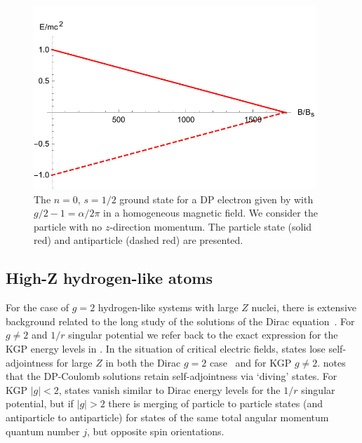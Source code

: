 \begin{figure}[ht]
     \centering
     \includegraphics[clip, trim=0.0cm 0.0cm 0.0cm 0.5cm,width=0.95\textwidth]{plots/chap02moment/lanplot02.pdf}
     \caption{The $n=0$, $s=1/2$ ground state for a DP electron given by  with $g/2-1=\alpha/2\pi$ in a homogeneous magnetic field. We consider the particle with no $z$-direction momentum. The particle state (solid red) and antiparticle (dashed red) are presented.}
     \label{f02}
\end{figure}

\subsection{High-Z hydrogen-like atoms}
\label{sec:sbc}
\noindent For the case of $g\!=\!2$ hydrogen-like systems with large $Z$ nuclei, there is extensive background related to the long study of the solutions of the Dirac equation~\citep{Rafelski:1976ts,Greiner:1985ce,Rafelski:2016ixr}. For $g\ne 2$ and $1/r$ singular potential we refer back to the exact expression for the KGP energy levels in . In the situation of critical electric fields, states lose self-adjointness for large $Z$ in both the Dirac $g\!=\!2$ case~\citep{Gesztesy:1984hd} and for KGP $g\!\neq\!2$. \cite{Thaller:1992ji} notes that the DP-Coulomb solutions retain self-adjointness via `diving' states. For KGP $|g|<2$, states vanish similar to Dirac energy levels for the $1/r$ singular potential, but if $|g|\!>\!2$ there is merging of particle to particle states (and antiparticle to antiparticle) for states of the same total angular momentum quantum number $j$, but opposite spin orientations.

